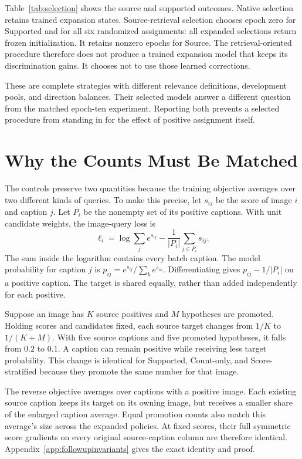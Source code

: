\documentclass[11pt]{article}
\begin{document}

Table~\ref{tab:selection} shows the source and supported outcomes. Native selection retains trained expansion states. Source-retrieval selection chooses epoch zero for Supported and for all six randomized assignments: all \FuExpansionZeroSelections{} expanded selections return frozen initialization. It retains nonzero epochs for Source. The retrieval-oriented procedure therefore does not produce a trained expansion model that keeps its discrimination gains. It chooses not to use those learned corrections.

These are complete strategies with different relevance definitions, development pools, and direction balances. Their selected models answer a different question from the matched epoch-ten experiment. Reporting both prevents a selected procedure from standing in for the effect of positive assignment itself.

\section{Why the Counts Must Be Matched}
\label{sec:countstructure}
The controls preserve two quantities because the training objective averages over two different kinds of queries. To make this precise, let $s_{ij}$ be the score of image $i$ and caption $j$. Let $P_i$ be the nonempty set of its positive captions. With unit candidate weights, the image-query loss is
\begin{equation}
\ell_i=\log\sum_j e^{s_{ij}}-\frac{1}{|P_i|}\sum_{j\in P_i}s_{ij}.
\label{eq:followuprow}
\end{equation}
The sum inside the logarithm contains every batch caption. The model probability for caption $j$ is $p_{ij}=e^{s_{ij}}/\sum_k e^{s_{ik}}$. Differentiating gives $p_{ij}-1/|P_i|$ on a positive caption. The target is shared equally, rather than added independently for each positive.

Suppose an image has $K$ source positives and $M$ hypotheses are promoted. Holding scores and candidates fixed, each source target changes from $1/K$ to $1/(K+M)$. With five source captions and five promoted hypotheses, it falls from $0.2$ to $0.1$. A caption can remain positive while receiving less target probability. This change is identical for Supported, Count-only, and Score-stratified because they promote the same number for that image.

The reverse objective averages over captions with a positive image. Each existing source caption keeps its target on its owning image, but receives a smaller share of the enlarged caption average. Equal promotion counts also match this average's size across the expanded policies. At fixed scores, their full symmetric score gradients on every original source-caption column are therefore identical. Appendix~\ref{app:followupinvariants} gives the exact identity and proof.
\end{document}
